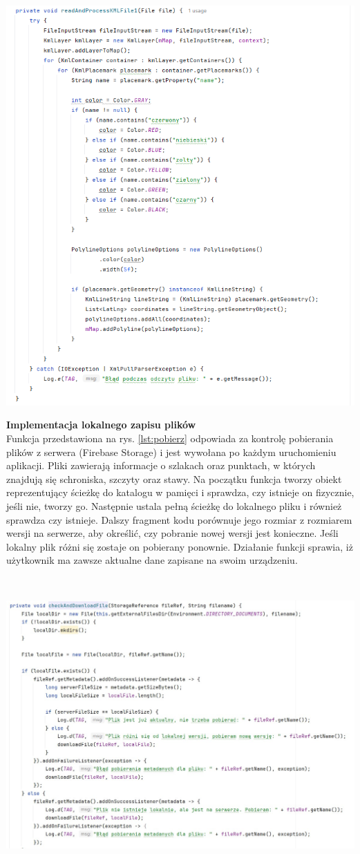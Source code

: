 \noindent
\begin{minipage}{\linewidth}
    \label{lst:rysowanie}
    \centering
    \includegraphics[width=0.6\linewidth]{img/kod/rysowanie-szlakow.png}
\end{minipage}



\textbf{Implementacja lokalnego zapisu plików} \\ 
Funkcja przedstawiona na rys. \ref{lst:pobierz} odpowiada za kontrolę pobierania plików z serwera (Firebase Storage) i jest wywołana po każdym uruchomieniu aplikacji. Pliki zawierają informacje o szlakach oraz punktach, w których znajdują się schroniska, szczyty oraz stawy. Na początku funkcja tworzy obiekt reprezentujący ścieżkę do katalogu w pamięci i sprawdza, czy istnieje on fizycznie, jeśli nie, tworzy go. Następnie ustala pełną ścieżkę do lokalnego pliku i również sprawdza czy istnieje. Dalszy fragment kodu porównuje jego rozmiar z rozmiarem wersji na serwerze, aby określić, czy pobranie nowej wersji jest konieczne. Jeśli lokalny plik różni się zostaje on pobierany ponownie. Działanie funkcji sprawia, iż użytkownik ma zawsze aktualne dane zapisane na swoim urządzeniu. 

\\

\noindent
\begin{minipage}{\linewidth}
    \label{lst:pobierz}
    \centering
    \includegraphics[width=0.6\linewidth]{img/kod/imp-ckeckandadd.jpg}
\end{minipage}\\

